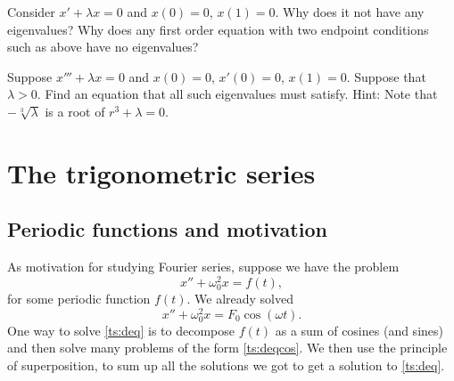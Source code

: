 \begin{exercise}
Consider
$x' + \lambda x = 0$ and $x(0)=0$, $x(1) = 0$.  Why does it not
have any eigenvalues?  Why does any first order equation with two endpoint
conditions such as above have no eigenvalues?
\end{exercise}

\begin{exercise}[challenging]
Suppose $x''' + \lambda x = 0$ and $x(0)=0$, $x'(0) = 0$, $x(1) = 0$.
Suppose that $\lambda > 0$.  Find an equation that all such
eigenvalues must satisfy.
Hint: Note that $-\sqrt[3]{\lambda}$ is a root
of $r^3+\lambda = 0$.
\end{exercise}


\sectionnewpage
\section{The trigonometric series} \label{ts:section}


\subsection{Periodic functions and motivation}

As motivation for studying Fourier series, suppose we have the problem
\begin{equation} \label{ts:deq}
x'' + \omega_0^2 x = f(t) ,
\end{equation}
for some periodic function $f(t)$.
We already solved
\begin{equation} \label{ts:deqcos}
x'' + \omega_0^2 x = F_0 \cos ( \omega t) .
\end{equation}
One way to solve \eqref{ts:deq} is to
decompose $f(t)$ as a sum of cosines (and sines) and then
solve many problems of the form \eqref{ts:deqcos}.  We then use
the principle of superposition, to sum up all the solutions we got
to get a solution to \eqref{ts:deq}.

